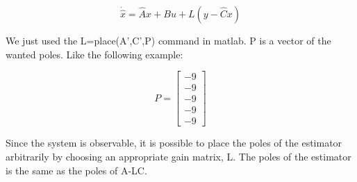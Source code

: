 \[
\dot{\hat{x}} = \hat{A}x + Bu + L(y - \hat{C}x)
\]

\vspace{1em}



\noindent
We just used the 
L=place(A',C',P) command in matlab. P is a vector of the wanted poles.
Like the following example:

\[
P = \begin{bmatrix}
-9 \\
-9 \\
-9 \\
-9 \\
-9
\end{bmatrix}
\]

\vspace{1em}



\noindent
 Since the system is observable, it is possible to place the poles of the estimator arbitrarily
 by choosing an appropriate gain matrix, L. The poles of the estimator is the same as
 the poles of A-LC. 
 

